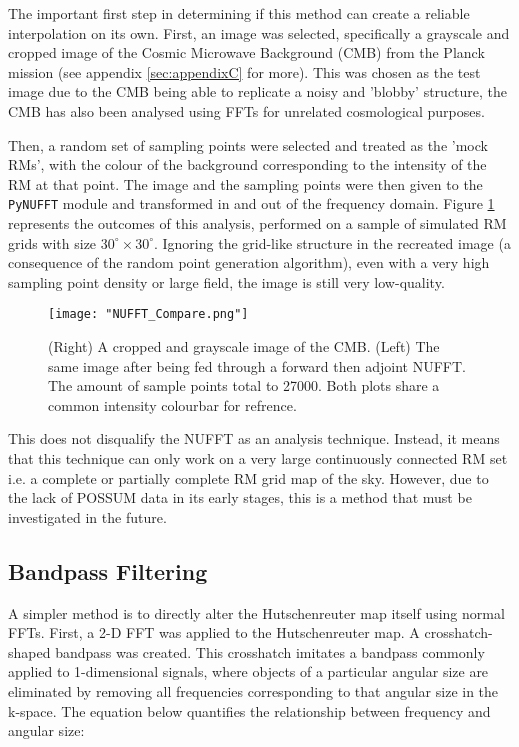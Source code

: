 The important first step in determining if this method can create a reliable interpolation on its own. First, an image was selected, specifically a grayscale and cropped image of the Cosmic Microwave Background (CMB) from the Planck mission (see appendix \ref{sec:appendixC} for more). This was chosen as the test image due to the CMB being able to replicate a noisy and 'blobby' structure, the CMB has also been analysed using FFTs for unrelated cosmological purposes.


Then, a random set of sampling points were selected and treated as the 'mock RMs', with the colour of the background corresponding to the intensity of the RM at that point. The image and the sampling points were then given to the \verb|PyNUFFT| module and transformed in and out of the frequency domain. Figure \ref{fig:nufft} represents the outcomes of this analysis, performed on a sample of simulated RM grids with size $30^{\circ}\times 30^{\circ}$. Ignoring the grid-like structure in the recreated image (a consequence of the random point generation algorithm), even with a very high sampling point density or large field, the image is still very low-quality.

\begin{figure}
    \texttt{[image: "NUFFT\_Compare.png"]}
    \centering
    \caption{(Right) A cropped and grayscale image of the CMB. (Left) The same image after being fed through a forward then adjoint NUFFT. The amount of sample points total to 27000. Both plots share a common intensity colourbar for refrence.}
    \label{fig:nufft}
\end{figure}


This does not disqualify the NUFFT as an analysis technique. Instead, it means that this technique can only work on a very large continuously connected RM set i.e. a complete or partially complete RM grid map of the sky. However, due to the lack of POSSUM data in its early stages, this is a method that must be investigated in the future.

\subsection{Bandpass Filtering}
\label{ssec:bandpass}

A simpler method is to directly alter the Hutschenreuter map itself using normal FFTs. First, a 2-D FFT was applied to the Hutschenreuter map. A crosshatch-shaped bandpass was created. This crosshatch imitates a bandpass commonly applied to 1-dimensional signals, where objects of a particular angular size are eliminated by removing all frequencies corresponding to that angular size in the k-space. The equation below quantifies the relationship between frequency and angular size:


